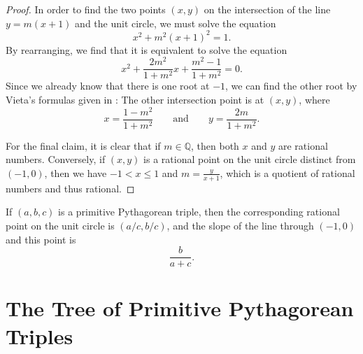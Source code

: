 \begin{proof}
  In order to find the two points $(x,y)$ on the intersection of the line $y=m(x+1)$ and the unit circle, we must solve the equation
  \begin{equation*}
    x^2+m^2(x+1)^2=1.
  \end{equation*}
  By rearranging, we find that it is equivalent to solve the equation
  \begin{equation*}
    x^2 + \frac{2m^2}{1+m^2}x + \frac{m^2-1}{1+m^2} = 0.
  \end{equation*}
  Since we already know that there is one root at $-1$, we can find the other root by Vieta's formulas given in : The other intersection point is at $(x,y)$, where
  \begin{equation*}
    x=\frac{1-m^2}{1+m^2}\qquad\text{and}\qquad y=\frac{2m}{1+m^2}.
  \end{equation*}

  For the final claim, it is clear that if $m \in \mathbb{Q}$, then both $x$ and $y$ are rational numbers. Conversely, if $(x,y)$ is a rational point on the unit circle distinct from $(-1,0)$, then we have $-1<x\leq 1$ and $m = \tfrac{y}{x+1}$, which is a quotient of rational numbers and thus rational.
\end{proof}

\begin{remark}
  If $(a,b,c)$ is a primitive Pythagorean triple, then the corresponding rational point on the unit circle is $(a/c,b/c)$,
  and the slope of the line through $(-1,0)$ and this point is
  \begin{equation*}
    \frac{b}{a+c}.
  \end{equation*}
\end{remark}

\section{The Tree of Primitive Pythagorean Triples}\label{section:tree-of-pythagorean-triples}

